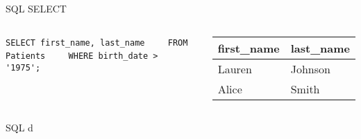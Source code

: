 \documentclass[aspectratio=169]{beamer}
\begin{document}
\begin{frame}[fragile]{SQL SELECT}
\begin{columns}
		\begin{tcolorbox}[colback=LightGreen, colframe=DarkGreen]
			\small
			\verb|SELECT first_name, last_name|
			\verb|    FROM Patients|
			\verb|    WHERE birth_date > '1975';|
		\end{tcolorbox}
		\pause
		
		\begin{tcolorbox}[colback=LightBlue, colframe=DarkBlue]
			{\tiny
				\begin{tabular}{ll}
					\bf first\_name & \bf last\_name \\ \hline
					Lauren & Johnson \\
					Alice & Smith \\
				\end{tabular}
			}
		\end{tcolorbox}
		
		\end{columns}
		
	\end{frame}

	\begin{frame}{SQL d}
	\end{frame}
\end{document}
